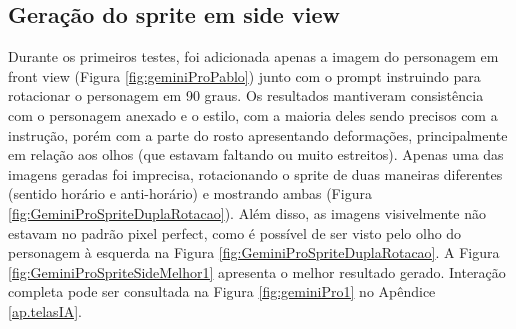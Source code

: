 \FloatBarrier
\subsection{Geração do sprite em side view}
\label{s.gemini.sideview}

Durante os primeiros testes, foi adicionada apenas a imagem do personagem em front view (Figura \ref{fig:geminiProPablo}) junto com o prompt instruindo para rotacionar o personagem em 90 graus. Os resultados mantiveram consistência com o personagem anexado e o estilo, com a maioria deles sendo precisos com a instrução, porém com a parte do rosto apresentando deformações, principalmente em relação aos olhos (que estavam faltando ou muito estreitos). Apenas uma das imagens geradas foi imprecisa, rotacionando o sprite de duas maneiras diferentes (sentido horário e anti-horário) e mostrando ambas (Figura \ref{fig:GeminiProSpriteDuplaRotacao}). Além disso, as imagens visivelmente não estavam no padrão pixel perfect, como é possível de ser visto pelo olho do personagem à esquerda na Figura \ref{fig:GeminiProSpriteDuplaRotacao}. A Figura \ref{fig:GeminiProSpriteSideMelhor1} apresenta o melhor resultado gerado. Interação completa pode ser consultada na Figura \ref{fig:geminiPro1} no Apêndice \ref{ap.telasIA}.

